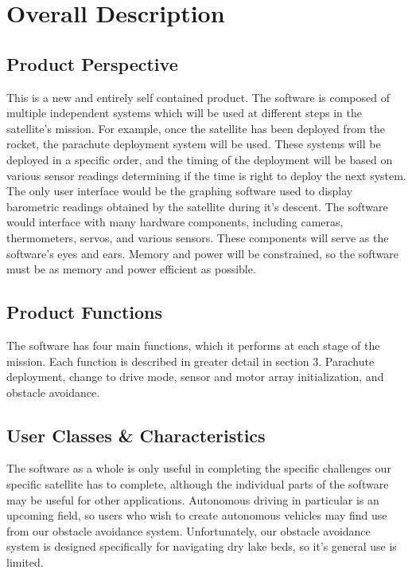 \documentclass[10pt,onecolumn,draftclsnofoot,document]{IEEEtran}
\begin{document}



\section{Overall Description}

\subsection{Product Perspective}
This is a new and entirely self contained product. The software is composed of multiple independent systems which will be used at different steps in the satellite's mission. For example, once the satellite has been deployed from the rocket, the parachute deployment system will be used. These systems will be deployed in a specific order, and the timing of the deployment will be based on various sensor readings determining if the time is right to deploy the next system. The only user interface would be the graphing software used to display barometric readings obtained by the satellite during it's descent. The software would interface with many hardware components, including cameras, thermometers, servos, and various sensors. These components will serve as the software's eyes and ears. Memory and power will be constrained, so the software must be as memory and power efficient as possible.

\subsection{Product Functions}
The software has four main functions, which it performs at each stage of the mission. Each function is described in greater detail in section 3. Parachute deployment, change to drive mode, sensor and motor array initialization, and obstacle avoidance.

\subsection{User Classes \& Characteristics}
The software as a whole is only useful in completing the specific challenges our specific satellite has to complete, although the individual parts of the software may be useful for other applications. Autonomous driving in particular is an upcoming field, so users who wish to create autonomous vehicles may find use from our obstacle avoidance system. Unfortunately, our obstacle avoidance system is designed specifically for navigating dry lake beds, so it's general use is limited. 
\end{document}
